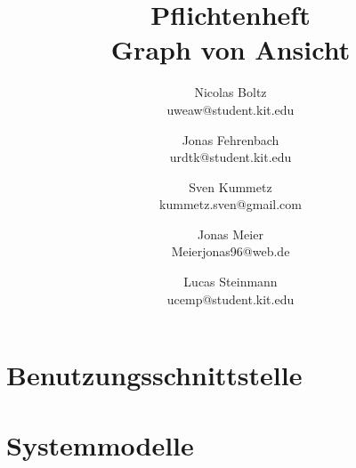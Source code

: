 \documentclass[a4paper]{scrreprt}
\begin{document}
\title{Pflichtenheft\\
Graph von Ansicht}
\date{}
\author{Nicolas Boltz   \\ uweaw@student.kit.edu
  \and Jonas Fehrenbach \\ urdtk@student.kit.edu
  \and Sven Kummetz     \\ kummetz.sven@gmail.com
  \and Jonas Meier      \\ Meierjonas96@web.de
  \and Lucas Steinmann  \\ ucemp@student.kit.edu
}
\maketitle


\tableofcontents













\chapter{Benutzungsschnittstelle}



\chapter{Systemmodelle}

\clearpage
\printglossary[type=\acronymtype]
\printglossary[title=Glossar,toctitle=Glossar]

\listoffigures
\end{document}
